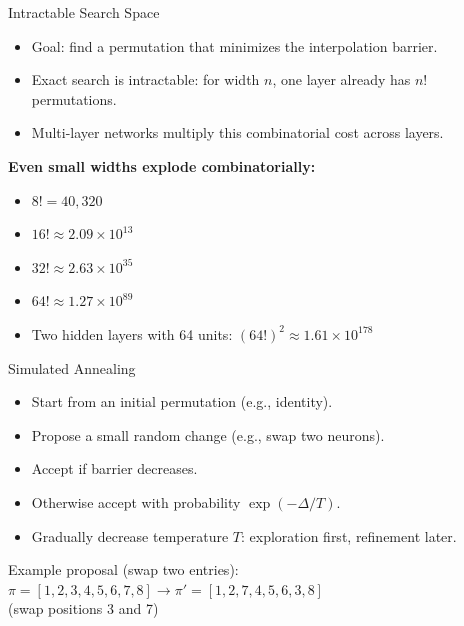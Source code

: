 \documentclass[aspectratio=169,11pt]{beamer}
\begin{document}
\begin{frame}{Intractable Search Space}
  \begin{itemize}
    \item Goal: find a permutation that minimizes the interpolation barrier.
    \item Exact search is intractable: for width $n$, one layer already has $n!$ permutations.
    \item Multi-layer networks multiply this combinatorial cost across layers.
  \end{itemize}

  \vspace{0.2cm}
  \textbf{Even small widths explode combinatorially:}
  \begin{itemize}
    \item $8! = 40{,}320$
    \item $16! \approx 2.09 \times 10^{13}$
    \item $32! \approx 2.63 \times 10^{35}$
    \item $64! \approx 1.27 \times 10^{89}$
    \item Two hidden layers with 64 units: $(64!)^2 \approx 1.61 \times 10^{178}$
  \end{itemize}
\end{frame}

\begin{frame}{Simulated Annealing}
  \begin{itemize}
    \item Start from an initial permutation (e.g., identity).
    \item Propose a small random change (e.g., swap two neurons).
    \item Accept if barrier decreases.
    \item Otherwise accept with probability $\exp(-\Delta/T)$.
    \item Gradually decrease temperature $T$: exploration first, refinement later.
  \end{itemize}
  \vfill
  \begin{center}
    \footnotesize
    Example proposal (swap two entries):\\[0.2em]
    $\pi = [1,2,3,4,5,6,7,8] \rightarrow \pi' = [1,2,7,4,5,6,3,8]$\\
    (swap positions 3 and 7)
  \end{center}
\end{frame}
\end{document}
